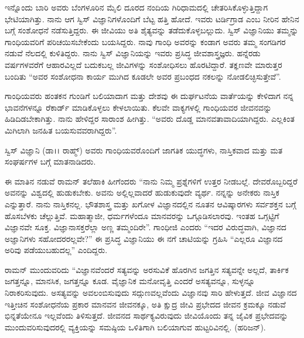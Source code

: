\vskip 2pt

ಇನ್ನೊಂದು ಬಾರಿ ಅವರು ಬೆಂಗಳೂರಿನ  ಮೈಲಿ ದೂರದ ನಂದಿಯ ಗಿರಿಧಾಮದಲ್ಲಿ ಚೇತರಿಸಿಕೊಳ್ಳುತ್ತಿದ್ದಾಗ ಭೇಟಿಯಾಗಿತ್ತು. ನಾನು ಆಗ ಸ್ವಿಸ್ ವಿಜ್ಞಾನಿಗಳೊಂದಿಗೆ ಬೆಟ್ಟ ಹತ್ತಿ ಹೋದೆ. ಇವರು ಟರ್ಡಿಗ್ರಾಡ ಎಂಬ ನೀರಿನ ಹೇನಿನ ಬಗ್ಗೆ ಸಂಶೋಧನೆ ನಡೆಸುತ್ತಿದ್ದರು. ಈ ಜೀವಿಯು ಅತಿ ಶೈತ್ಯವನ್ನು ತಡೆದುಕೊಳ್ಳಬಲ್ಲುದು. ಸ್ವಿಸ್ ವಿಜ್ಞಾನಿಯು ತಮ್ಮನ್ನು ಗಾಂಧಿಯವರಿಗೆ ಪರಿಚಯಿಸಬೇಕೆಂದು ಬಯಸಿದ್ದರು. ನಾವು ಗಾಂಧಿ ಅವರನ್ನು ಕಂಡಾಗ ಅವರು ತಮ್ಮ ಸಂಗಡಿಗರ ನಡುವೆ ನೆಲದಲ್ಲಿ ಕುಳಿತಿದ್ದರು. ನಾನು ಸ್ವಿಸ್ ವಿಜ್ಞಾನಿಯನ್ನು ಇವರು ಪ್ರಸಿದ್ಧ ಜೀವಶಾಸ್ತ್ರಜ್ಞರು. ಹನ್ನೆರಡು ವರ್ಷಗಳವರೆಗೆ ಆಹಾರವಿಲ್ಲದೆ ಬದುಕಬಲ್ಲ ಜೀವಿಗಳನ್ನು ಸಂಶೋಧಿಸಲು ಹೊರಟಿದ್ದಾರೆ. ತಕ್ಞಣವೇ ಮಾರುತ್ತರ ಬಂದಿತು “ಅವರ ಸಂಶೋಧನಾ ಕಾರ್ಯ ಮುಗಿದ ಕೂಡಲೇ ಅವರ ಪ್ರಬಂಧದ ನಕಲನ್ನು ನೋಡಲಿಚ್ಛಿಸುತ್ತೇವೆ”.

\vskip 2pt

ಗಾಂಧಿಯವರು ಹಂತಕನ ಗುಂಡಿಗೆ ಬಲಿಯಾದಾಗ ಮತ್ತು ದೇಶವು ಈ ದುರ್ಘಟನೆಯ ವಾರ್ತೆ\-ಯನ್ನು ಕೇಳಿದಾಗ ನನ್ನ ಭಾವನೆಗಳನ್ನೂ ರೆಕಾರ್ಡ್ ಮಾಡಿಕೊಳ್ಳಲು ಕೇಳಲಾಯಿತು. ಕೆಲವೇ ವಾಕ್ಯ\-ಗಳಲ್ಲಿ ಗಾಂಧಿಯವರ ಜೀವನವನ್ನು ಹಿಡಿದಿಡಬೇಕಾಗಿತ್ತು. ನಾನು ಹೇಳಿದ್ದರ ಸಾರಾಂಶ ಹೀಗಿತ್ತು.\- “ಅವರು ದೊಡ್ಡ ಮಾನವತಾವಾದಿಯಾಗಿದ್ದರು. ಎಲ್ಲಕಿಂತ ಮಿಗಿಲಾಗಿ ಜನಹಿತ ಬಯಸುವವರಾಗಿದ್ದರು”.

\vskip 2pt

ಸ್ವಿಸ್ ವಿಜ್ಞಾನಿ (ಡಾ।। ರಾಹ್ಮ್) ಅವರು ಗಾಂಧಿಯವರೊಂದಿಗೆ ಜಾಗತಿಕ ಯುದ್ಧಗಳು, ನಾಸ್ತಿಕವಾದ ಮತ್ತು ಮತ ಸಂಘರ್ಷಗಳ ಬಗ್ಗೆ ಮಾತನಾಡಿದರು.

\vskip 2pt

ಈ ಮಾತಿನ ನಡುವೆ ರಾಮನ್ ತಲೆಹಾಕಿ ಹೀಗೆಂದರು “ನಾನು ನಿಮ್ಮ ಪ್ರಶ್ನೆಗಳಿಗೆ ಉತ್ತರ ನೀಡಬಲ್ಲೆ. ದೇವರೊಬ್ಬರಿದ್ದರೆ ಅವನನ್ನು ವಿಶ್ವದಲ್ಲಿ ಹುಡುಕಬೇಕು. ಅವನು ಅಲ್ಲಿಲ್ಲವಾದರೆ ಹುಡುಕುವುದೇ ವ್ಯರ್ಥ. ನನ್ನನ್ನು ಅನೇಕರು ನಾಸ್ತಿಕ ಎನ್ನುತ್ತಾರೆ. ನಾನು ನಾಸ್ತಿಕನಲ್ಲ. ಭೌತಶಾಸ್ತ್ರ ಮತ್ತು ಖಗೋಳ ವಿಜ್ಞಾನದಲ್ಲಿನ ನೂತನ ಆವಿಷ್ಕಾರಗಳು ಸರ್ವಶಕ್ತನ ಬಗ್ಗೆ ಹೊಸಬೆಳಕು ಚೆಲ್ಲುತ್ತಿವೆ. ಮಹಾತ್ಮಾಜೀ, ಧರ್ಮಗಳೆಂದೂ ಮಾನವರನ್ನು ಒಗ್ಗೂಡಿಸಲಾರವು. ಇಂತಹ ಒಗ್ಗಟ್ಟಿಗೆ ವಿಜ್ಞಾನವೇ ಸೂಕ್ತ. ವಿಜ್ಞಾನಾಸಕ್ತರೆಲ್ಲಾ ಅಣ್ಣ ತಮ್ಮಂದಿರೇ”. ಗಾಂಧೀಜಿ ಎಂದರು\enginline{--} “ಇದರ ವಿರುದ್ಧವಾಗಿ, ವಿಜ್ಞಾನದ ಅಜ್ಞಾನಿಗಳು ಸಹೋದರರಲ್ಲವೇ?” ಈ ಪ್ರಸಿದ್ಧ ವಿಜ್ಞಾನಿಯು ಈ ನಗೆ ಚಾಟಿಯನ್ನು ಗ್ರಹಿಸಿ \enginline{--} “ಎಲ್ಲರೂ ವಿಜ್ಞಾನದ ಅರಿವು ಪಡೆಯುಬಹುದಲ್ಲ” ಎಂದಿದ್ದರು.

\vskip 2pt

ರಾಮನ್ ಮುಂದುವರಿದು \enginline{--} “ವಿಜ್ಞಾನವೆಂದರೆ ಸತ್ಯವನ್ನು ಅರಸುವಿಕೆ \enginline{--} ಹೊರಗಿನ ಜಗತ್ತಿನ ಸತ್ಯವನ್ನೇ ಅಲ್ಲದೆ, ತಾರ್ಕಿಕ ಜಗತ್ತನ್ನೂ, ಮಾನಸಿಕ, ಜಗತ್ತನ್ನೂ ಕೂಡ. ವೈಜ್ಞಾನಿಕ ಮನೋವೃತ್ತಿ ಎಂದರೆ ಅಸತ್ಯವನ್ನೂ, ಸುಳ್ಳನ್ನೂ ನಿರಾಕರಿಸುವುದು. ಅಸತ್ಯವನ್ನು ಅವಲಂಬಿಸುವುದು ಸದ್ಗುಣ\-ವಲ್ಲವೆಂದು ವಿಜ್ಞಾನವು ಸಾರಿ ಹೇಳುತ್ತದೆ. ಜೀವ ವಿಜ್ಞಾನದ ಇತ್ತೀಚಿನ ಸಂಶೋಧನೆಯ ಪ್ರಕಾರ ಮಾನವನ ಜೀವನಕ್ಕೂ, ಅತಿ ಕ್ಷುದ್ರ ಜೀವಿ ಪ್ರಭೇದದ ಜೀವನ ಕ್ರಮಕ್ಕೂ ನಡುವೆ ಭಿನ್ನತೆಯೇನೂ ಇಲ್ಲವೆಂದು ತಿಳಿಸುತ್ತದೆ. ಜೀವನದ ಸಾರ್ಥಕ್ಯವಿರುವುದು ಜೀವಿಯೊಂದು ತನ್ನ ಜೈವಿಕ ಪ್ರಭೇದವನ್ನು ಮುಂದುವರಿಸುವುದರಲ್ಲಿ \enginline{--} ವ್ಯಕ್ತಿಯನ್ನು ಸಮಷ್ಠಿಯ ಒಳಿತಿಗಾಗಿ ಬಲಿಯಾಗುವ ಹುಟ್ಟರಿವಿನಲ್ಲಿ. (ಹರಿಜನ್\enginline{--}).

